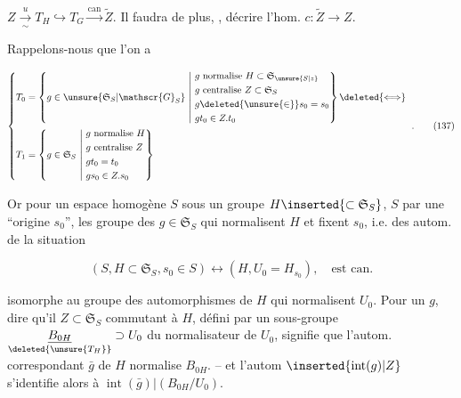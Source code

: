 

$Z\xrightarrow[\sim]{u}T_H\hookrightarrow T_G\xrightarrow{\mathrm{can}}\widetilde Z$. Il faudra de plus, , décrire l'hom. $c:\widetilde Z\longrightarrow Z$.

Rappelons-nous que l'on a

\[\left\{\begin{aligned}
T_0&=\left\{g\in\unsure{\mathfrak{S}_S|\mathscr{G}_S}\ \middle|\ 
\begin{aligned}&g\text{ normalise }H\subset\mathfrak S_{\unsure{S|z}}\\&g\text{ centralise } Z\subset\mathfrak S_S\\&g\deleted{\unsure{\in}}s_0=s_0\\&gt_0\in Z.t_0\end{aligned}\right\}\deleted{\Longleftrightarrow}\\
T_1&=\left\{g\in\mathfrak S_S\ \middle|\ 
\begin{aligned}&g\text{ normalise }H\\&g\text{ centralise }Z\\&gt_0=t_0\\&gs_0\in Z.s_0\end{aligned}\right\}
\end{aligned}\right.\ .\tag*{(137)}\]


Or pour un espace homogène $S$ sous un groupe $H\inserted{\subset\mathfrak S_S}$, $S$ \unsure{ponctué|pointé} par une ``origine $s_0$'', les groupe des $g\in\mathfrak S_S$ qui normalisent $H$ et fixent $s_0$, i.e. des autom. de la situation

\[(S,H\subset\mathfrak S_S,s_0\in S)\longleftrightarrow(H,U_0=H_{s_0}),\quad\text{est can.}\]

isomorphe au groupe des automorphismes \inserted{$\bar g\deleted{\unsure{g}}$} de $H$ qui  normalisent $U_0$.  Pour un  $g$, dire qu'il   $Z\subset\mathfrak S_S$ commutant à  $H$, défini par un sous-groupe $\underset{\deleted{\unsure{T_H}}}{\underline{B_{0H}}}\supset U_0$ du normalisateur de $U_0$,  signifie que l'autom. correspondant $\bar g$ de $H$ normalise $B_{0H}$. -- et l'autom  $\inserted{\operatorname{int}(g)|Z}$ s'identifie alors à $\operatorname{int}(\bar g)|(B_{0H}/U_0)$.


